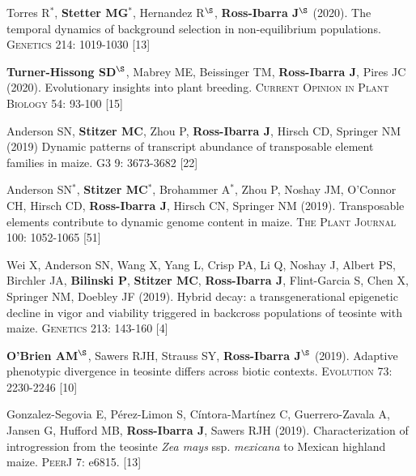 \documentclass[letterpaper,10pt]{article}
\begin{document}
\begin{etaremune}
\item Torres R$^*$, \textbf{Stetter MG}$^*$, Hernandez R$^\S$, \textbf{Ross-Ibarra J}$^\S$ (2020). The temporal dynamics of background selection in non-equilibrium populations. \textsc{Genetics} 214: 1019-1030
 [13]\\

\item \textbf{Turner-Hissong SD}$^\S$, Mabrey ME, Beissinger TM, \textbf{Ross-Ibarra J}, Pires JC (2020). Evolutionary insights into plant breeding. \textsc{Current Opinion in Plant Biology} 54: 93-100
 [15]\\

\item  Anderson SN, \textbf{Stitzer MC},  Zhou P, \textbf{Ross-Ibarra J}, Hirsch CD, Springer NM (2019) Dynamic patterns of transcript abundance of transposable element families in maize. \textsc{G3} 9: 3673-3682
 [22]\\

\item  Anderson SN$^*$, \textbf{Stitzer MC}$^*$,  Brohammer A$^*$, Zhou P, Noshay JM,  O'Connor CH, Hirsch CD, \textbf{Ross-Ibarra J}, Hirsch CN, Springer NM (2019). Transposable elements contribute to dynamic genome content in maize. \textsc{The Plant Journal} 100: 1052-1065
 [51]\\

\item Wei X,  Anderson SN,  Wang X,  Yang L, Crisp PA,  Li Q,  Noshay J, Albert PS, Birchler JA,  \textbf{Bilinski P}, \textbf{Stitzer MC}, \textbf{Ross-Ibarra J},  Flint-Garcia S,  Chen X,  Springer NM, Doebley JF (2019). Hybrid decay: a transgenerational epigenetic decline in vigor and viability triggered in backcross populations of teosinte with maize. \textsc{Genetics} 213: 143-160
 [4]\\

\item \textbf{O'Brien AM}$^\S$, Sawers RJH, Strauss SY, \textbf{Ross-Ibarra J}$^\S$ (2019). Adaptive phenotypic divergence in teosinte differs across biotic contexts. \textsc{Evolution} 73: 2230-2246
 [10]\\

\item  Gonzalez-Segovia E,  P\'erez-Limon S,  C\'intora-Mart\'inez C,  Guerrero-Zavala A,  Jansen G,  Hufford MB, \textbf{Ross-Ibarra J}, Sawers RJH (2019). Characterization of introgression from the teosinte \textit{Zea mays} ssp. \textit{mexicana} to Mexican highland maize. \textsc{PeerJ} 7: e6815. %
 [13]\\


\end{etaremune}
\end{document}
